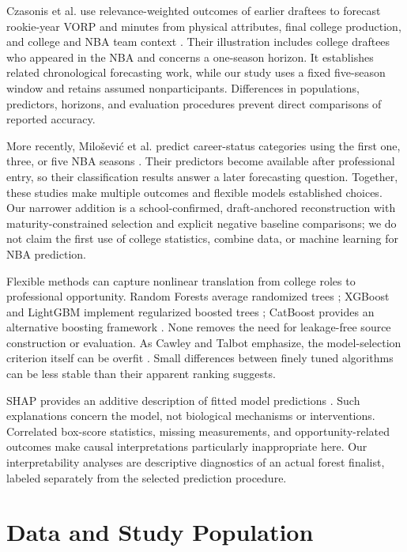 \documentclass[11pt]{article}
\begin{document}
Czasonis et al. use relevance-weighted outcomes of earlier draftees to forecast rookie-year VORP and minutes from physical attributes, final college production, and college and NBA team context \cite{czasonis}. Their illustration includes college draftees who appeared in the NBA and concerns a one-season horizon. It establishes related chronological forecasting work, while our study uses a fixed five-season window and retains assumed nonparticipants. Differences in populations, predictors, horizons, and evaluation procedures prevent direct comparisons of reported accuracy.

More recently, Milo\v{s}evi\'{c} et al. predict career-status categories using the first one, three, or five NBA seasons \cite{milosevic}. Their predictors become available after professional entry, so their classification results answer a later forecasting question. Together, these studies make multiple outcomes and flexible models established choices. Our narrower addition is a school-confirmed, draft-anchored reconstruction with maturity-constrained selection and explicit negative baseline comparisons; we do not claim the first use of college statistics, combine data, or machine learning for NBA prediction.

Flexible methods can capture nonlinear translation from college roles to professional opportunity. Random Forests average randomized trees \cite{breiman}; XGBoost and LightGBM implement regularized boosted trees \cite{xgboost,lightgbm}; CatBoost provides an alternative boosting framework \cite{catboost}. None removes the need for leakage-free source construction or evaluation. As Cawley and Talbot emphasize, the model-selection criterion itself can be overfit \cite{cawley}. Small differences between finely tuned algorithms can be less stable than their apparent ranking suggests.

SHAP provides an additive description of fitted model predictions \cite{shap}. Such explanations concern the model, not biological mechanisms or interventions. Correlated box-score statistics, missing measurements, and opportunity-related outcomes make causal interpretations particularly inappropriate here. Our interpretability analyses are descriptive diagnostics of an actual forest finalist, labeled separately from the selected prediction procedure.

\section{Data and Study Population}
\end{document}
